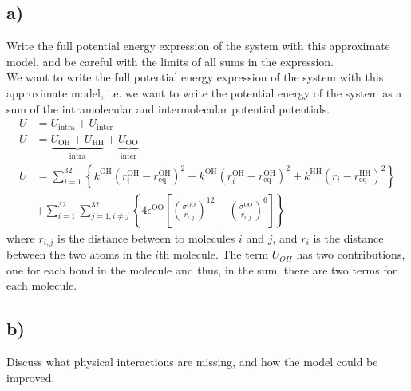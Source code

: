\documentclass[a4paper]{article}
\newcommand{\nl}{\\\newline\noindent}
\begin{document}
\subsection*{a)}
Write the full potential energy expression of the system with this approximate model, and be careful with the limits of all sums in the expression.
\nl
We want to write the full potential energy expression of the system with this approximate model, i.e. we want to write the potential energy of the system as a sum of the intramolecular and intermolecular potential potentials.
\begin{align*}
    U &= U_{\text{intra}} + U_{\text{inter}}\\
    U &= \underbrace{U_{\text{OH}} + U_{\text{HH}}}_{\text{intra}} + \underbrace{U_{\text{OO}}}_{\text{inter}}\\
    U &= \sum_{i = 1}^{32}\left\{k^{\text{OH}}\left(r_i^{\text{OH}} - r_{\text{eq}}^\text{OH}\right)^2 + k^{\text{OH}}\left(r_i^{\text{OH}} - r_{\text{eq}}^\text{OH}\right)^2 + k^{\text{HH}}\left(r_i - r_{\text{eq}}^{\text{HH}}\right)^2\right\}\\
    &+ \sum_{i=1}^{32}\sum_{j = 1, i \neq j}^{32}\left\{4\epsilon^{\text{OO}}\left[\left(\frac{\sigma^{\text{OO}}}{r_{i,j}}\right)^{12} - \left(\frac{\sigma^{\text{OO}}}{r_{i,j}}\right)^6\right]\right\}
\end{align*}where $r_{i,j}$ is the distance between to molecules $i$ and $j$, and $r_i$ is the distance between the two atoms in the $i$th molecule.
The term $U_{OH}$ has two contributions, one for each bond in the molecule and thus, in the sum, there are two terms for each molecule.

\subsection*{b)}
Discuss what physical interactions are missing, and how the model could be improved.
\end{document}
